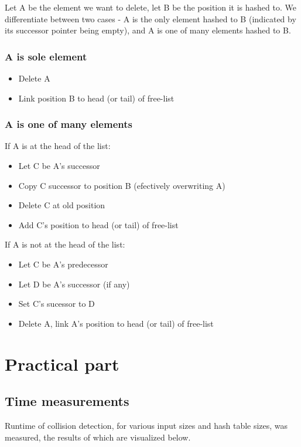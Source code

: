 \documentclass[a4paper]{scrartcl}
\begin{document}
Let A be the element we want to delete, let B be the position it is hashed to.
We differentiate between two cases - A is the only element hashed to B
(indicated by its successor pointer being empty), and A is one of many elements
hashed to B.

\subsubsection{A is sole element}

\begin{itemize}
	\item Delete A
	\item Link position B to head (or tail) of free-list
\end{itemize}

\subsubsection{A is one of many elements}

If A is at the head of the list:
\begin{itemize}
	\item Let C be A's successor
	\item Copy C successor to position B (efectively overwriting A)
	\item Delete C at old position
	\item Add C's position to head (or tail) of free-list
\end{itemize}

If A is not at the head of the list:
\begin{itemize}
	\item Let C be A's predecessor
	\item Let D be A's successor (if any)
	\item Set C's sucessor to D
	\item Delete A, link A's position to head (or tail) of free-list
\end{itemize}

\section{Practical part}

\subsection{Time measurements}

Runtime of collision detection, for various input sizes and hash table sizes,
was measured, the results of which are visualized below.
\end{document}
